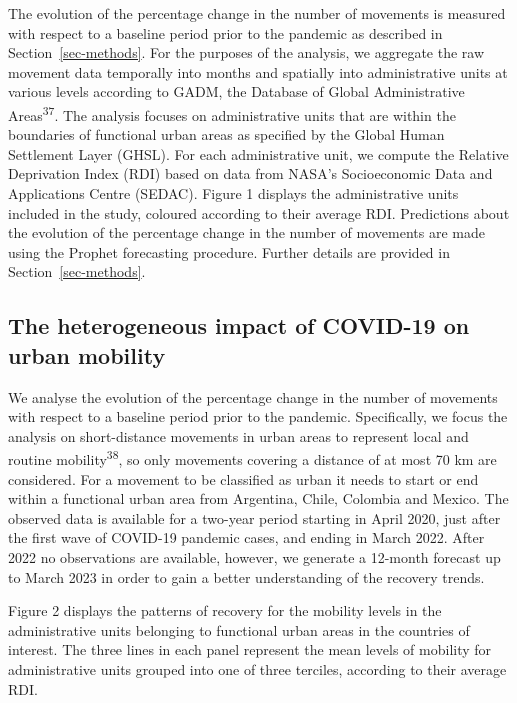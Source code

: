 \documentclass[
  11pt,
]{article}
\begin{document}
The evolution of the percentage change in the number of movements is
measured with respect to a baseline period prior to the pandemic as
described in Section~\ref{sec-methods}. For the purposes of the
analysis, we aggregate the raw movement data temporally into months and
spatially into administrative units at various levels according to GADM,
the Database of Global Administrative Areas\textsuperscript{37}. The
analysis focuses on administrative units that are within the boundaries
of functional urban areas as specified by the Global Human Settlement
Layer (GHSL). For each administrative unit, we compute the Relative
Deprivation Index (RDI) based on data from NASA's Socioeconomic Data and
Applications Centre (SEDAC). Figure 1 displays the administrative units
included in the study, coloured according to their average RDI.
Predictions about the evolution of the percentage change in the number
of movements are made using the Prophet forecasting procedure. Further
details are provided in Section~\ref{sec-methods}.

\subsection{The heterogeneous impact of COVID-19 on urban
mobility}\label{the-heterogeneous-impact-of-covid-19-on-urban-mobility}

We analyse the evolution of the percentage change in the number of
movements with respect to a baseline period prior to the pandemic.
Specifically, we focus the analysis on short-distance movements in urban
areas to represent local and routine mobility\textsuperscript{38}, so
only movements covering a distance of at most 70 km are considered. For
a movement to be classified as urban it needs to start or end within a
functional urban area from Argentina, Chile, Colombia and Mexico. The
observed data is available for a two-year period starting in April 2020,
just after the first wave of COVID-19 pandemic cases, and ending in
March 2022. After 2022 no observations are available, however, we
generate a 12-month forecast up to March 2023 in order to gain a better
understanding of the recovery trends.

Figure 2 displays the patterns of recovery for the mobility levels in
the administrative units belonging to functional urban areas in the
countries of interest. The three lines in each panel represent the mean
levels of mobility for administrative units grouped into one of three
terciles, according to their average RDI.
\end{document}
